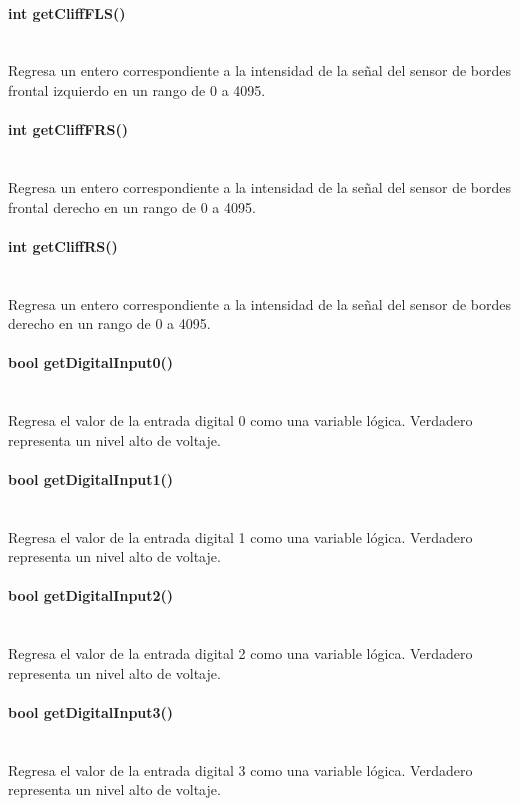 \documentclass[letterpaper,openright,12pt]{book}
\begin{document}
\paragraph{int getCliffFLS()}\mbox{}\\
Regresa un entero correspondiente a la intensidad de la señal del sensor de bordes frontal izquierdo en un rango de 0 a 4095.\\
\paragraph{int getCliffFRS()}\mbox{}\\
Regresa un entero correspondiente a la intensidad de la señal del sensor de bordes frontal derecho en un rango de 0 a 4095.\\
\paragraph{int getCliffRS()}\mbox{}\\
Regresa un entero correspondiente a la intensidad de la señal del sensor de bordes derecho en un rango de 0 a 4095.\\
\paragraph{	bool getDigitalInput0()}\mbox{}\\
Regresa el valor de la entrada digital 0 como una variable lógica. Verdadero representa un nivel alto de voltaje.\\
\paragraph{bool getDigitalInput1()}\mbox{}\\
Regresa el valor de la entrada digital 1 como una variable lógica. Verdadero representa un nivel alto de voltaje.\\
\paragraph{bool getDigitalInput2()}\mbox{}\\
Regresa el valor de la entrada digital 2 como una variable lógica. Verdadero representa un nivel alto de voltaje.\\
\paragraph{bool getDigitalInput3()}\mbox{}\\
Regresa el valor de la entrada digital 3 como una variable lógica. Verdadero representa un nivel alto de voltaje.\\
\end{document}
